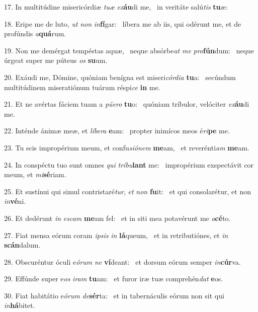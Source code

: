 17. In multitúdine misericórdiæ \textit{tu}\textit{æ} \textit{ex}\textbf{áu}di me, \ast\  in veritáte salú\textit{tis} \textbf{tu}æ:\

18. Eripe me de luto, \textit{ut} \textit{non} \textit{in}\textbf{fí}gar: \ast\  líbera me ab iis, qui odérunt me, et de profúndis \textit{a}\textbf{quá}rum.\

19. Non me demérgat tempéstas aquæ, \dag\  neque absórbe\textit{at} \textit{me} \textit{pro}\textbf{fún}dum: \ast\  neque úrgeat super me púteus \textit{os} \textbf{su}um.\

20. Exáudi me, Dómine, quóniam benígna est miseri\textit{cór}\textit{di}\textit{a} \textbf{tu}a: \ast\  secúndum multitúdinem miseratiónum tuárum réspi\textit{ce} \textbf{in} me.\

21. Et ne avértas fáciem tuam a \textit{pú}\textit{e}\textit{ro} \textbf{tu}o: \ast\  quóniam tríbulor, velóciter \textit{ex}\textbf{áu}di me.\

22. Inténde ánimæ meæ, et \textit{lí}\textit{be}\textit{ra} \textbf{e}am: \ast\  propter inimícos meos é\textit{ri}\textbf{pe} me.\

23. Tu scis impropérium meum, et confu\textit{si}\textit{ó}\textit{nem} \textbf{me}am, \ast\  et reverénti\textit{am} \textbf{me}am.\

24. In conspéctu tuo sunt omnes \textit{qui} \textit{trí}\textit{bu}\textbf{lant} me: \ast\  impropérium exspectávit cor meum, et \textit{mi}\textbf{sé}riam.\

25. Et sustínui qui simul contristaré\textit{tur}, \textit{et} \textit{non} \textbf{fu}it: \ast\  et qui consolarétur, et non \textit{in}\textbf{vé}ni.\

26. Et dedérunt \textit{in} \textit{es}\textit{cam} \textbf{me}am fel: \ast\  et in siti mea potavérunt me \textit{a}\textbf{cé}to.\

27. Fiat mensa eórum coram \textit{ip}\textit{sis} \textit{in} \textbf{lá}queum, \ast\  et in retributiónes, et \textit{in} \textbf{scán}dalum.\

28. Obscuréntur óculi e\textit{ó}\textit{rum} \textit{ne} \textbf{ví}deant: \ast\  et dorsum eórum semper \textit{in}\textbf{cúr}va.\

29. Effúnde super e\textit{os} \textit{i}\textit{ram} \textbf{tu}am: \ast\  et furor iræ tuæ comprehén\textit{dat} \textbf{e}os.\

30. Fiat habitátio e\textit{ó}\textit{rum} \textit{de}\textbf{sér}ta: \ast\  et in tabernáculis eórum non sit qui \textit{in}\textbf{há}bitet.\

